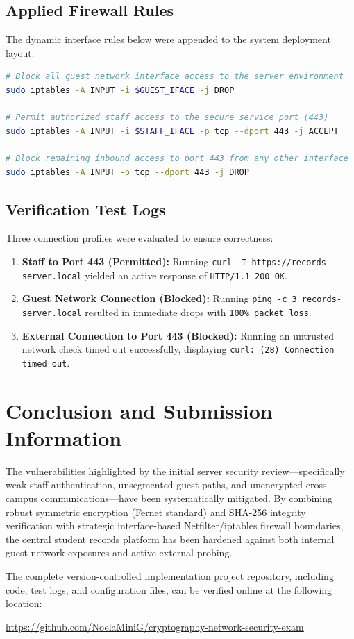 \documentclass[11pt,a4paper]{article}
\begin{document}
\subsection{Applied Firewall Rules}
The dynamic interface rules below were appended to the system deployment layout:
\begin{lstlisting}[language=bash]
# Block all guest network interface access to the server environment
sudo iptables -A INPUT -i $GUEST_IFACE -j DROP

# Permit authorized staff access to the secure service port (443)
sudo iptables -A INPUT -i $STAFF_IFACE -p tcp --dport 443 -j ACCEPT

# Block remaining inbound access to port 443 from any other interface
sudo iptables -A INPUT -p tcp --dport 443 -j DROP
\end{lstlisting}

\subsection{Verification Test Logs}
Three connection profiles were evaluated to ensure correctness:
\begin{enumerate}
    \item \textbf{Staff to Port 443 (Permitted):} Running \texttt{curl -I https://records-server.local} yielded an active response of \texttt{HTTP/1.1 200 OK}.
    \item \textbf{Guest Network Connection (Blocked):} Running \texttt{ping -c 3 records-server.local} resulted in immediate drops with \texttt{100\% packet loss}.
    \item \textbf{External Connection to Port 443 (Blocked):} Running an untrusted network check timed out successfully, displaying \texttt{curl: (28) Connection timed out}.
\end{enumerate}

\section{Conclusion and Submission Information}
The vulnerabilities highlighted by the initial server security review—specifically weak staff authentication, unsegmented guest paths, and unencrypted cross-campus communications—have been systematically mitigated. By combining robust symmetric encryption (Fernet standard) and SHA-256 integrity verification with strategic interface-based Netfilter/iptables firewall boundaries, the central student records platform has been hardened against both internal guest network exposures and active external probing. 

The complete version-controlled implementation project repository, including code, test logs, and configuration files, can be verified online at the following location:

\begin{center}
\url{https://github.com/NoelaMiniG/cryptography-network-security-exam}
\end{center}
\end{document}
